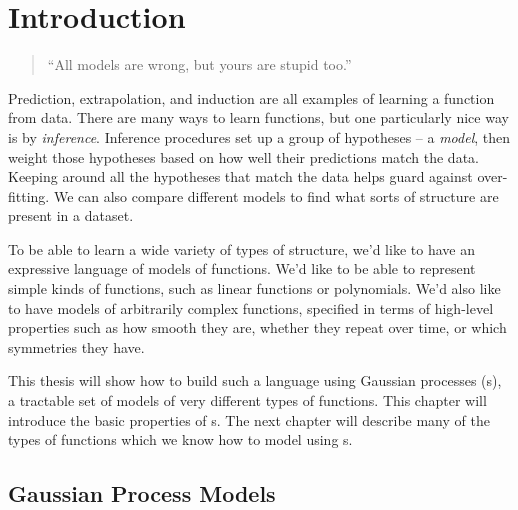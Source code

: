 
\inbpdocument

\chapter{Introduction}
\label{ch:intro}




\begin{quotation}
``All models are wrong, but yours are stupid too.'' \\
\hspace*{\fill} \citet{mlhipster}
\end{quotation}

Prediction, extrapolation, and induction are all examples of learning a function from data.
There are many ways to learn functions, but one particularly nice way is by \emph{inference}.
Inference procedures set up a group of hypotheses -- a \emph{model}, then weight those hypotheses based on how well their predictions match the data.
Keeping around all the hypotheses that match the data helps guard against over-fitting.
We can also compare different models to find what sorts of structure are present in a dataset.

To be able to learn a wide variety of types of structure, we'd like to have an expressive language of models of functions.
We'd like to be able to represent simple kinds of functions, such as linear functions or polynomials.
We'd also like to have models of arbitrarily complex functions, specified in terms of high-level properties such as how smooth they are, whether they repeat over time, or which symmetries they have.

This thesis will show how to build such a language using Gaussian processes (\gp{}s), a tractable set of models of very different types of functions.
This chapter will introduce the basic properties of \gp{}s.
The next chapter will describe many of the types of functions which we know how to model using \gp{}s.




\section{Gaussian Process Models}

